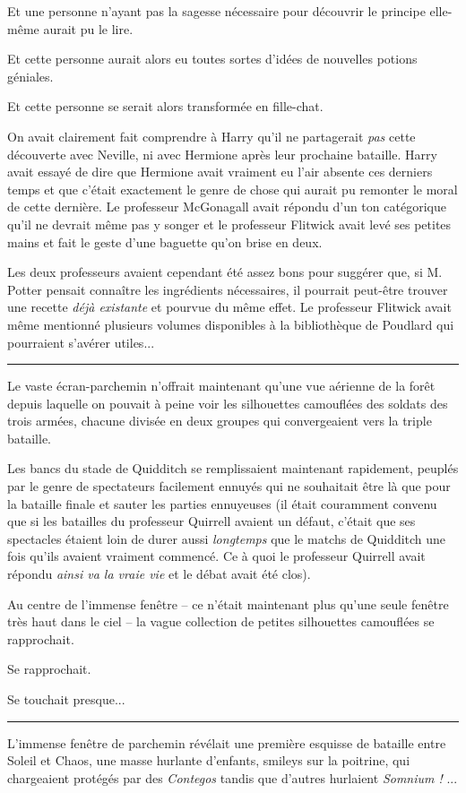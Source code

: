 Et une personne n'ayant pas la sagesse nécessaire pour découvrir le principe elle-même aurait pu le lire.

Et cette personne aurait alors eu toutes sortes d'idées de nouvelles potions géniales.

Et cette personne se serait alors transformée en fille-chat.

On avait clairement fait comprendre à Harry qu'il ne partagerait \emph{pas } cette découverte avec Neville, ni avec Hermione après leur prochaine bataille. Harry avait essayé de dire que Hermione avait vraiment eu l'air absente ces derniers temps et que c'était exactement le genre de chose qui aurait pu remonter le moral de cette dernière. Le professeur McGonagall avait répondu d'un ton catégorique qu'il ne devrait même pas y songer et le professeur Flitwick avait levé ses petites mains et fait le geste d'une baguette qu'on brise en deux.

Les deux professeurs avaient cependant été assez bons pour suggérer que, si M. Potter pensait connaître les ingrédients nécessaires, il pourrait peut-être trouver une recette \emph{déjà existante}  et pourvue du même effet. Le professeur Flitwick avait même mentionné plusieurs volumes disponibles à la bibliothèque de Poudlard qui pourraient s'avérer utiles...
\par\noindent\rule{\textwidth}{0.4pt}
Le vaste écran-parchemin n'offrait maintenant qu'une vue aérienne de la forêt depuis laquelle on pouvait à peine voir les silhouettes camouflées des soldats des trois armées, chacune divisée en deux groupes qui convergeaient vers la triple bataille.

Les bancs du stade de Quidditch se remplissaient maintenant rapidement, peuplés par le genre de spectateurs facilement ennuyés qui ne souhaitait être là que pour la bataille finale et sauter les parties ennuyeuses (il était couramment convenu que si les batailles du professeur Quirrell avaient un défaut, c'était que ses spectacles étaient loin de durer aussi \emph{longtemps } que le matchs de Quidditch une fois qu'ils avaient vraiment commencé. Ce à quoi le professeur Quirrell avait répondu \emph{ainsi va la vraie vie } et le débat avait été clos).

Au centre de l'immense fenêtre – ce n'était maintenant plus qu'une seule fenêtre très haut dans le ciel – la vague collection de petites silhouettes camouflées se rapprochait.

Se rapprochait.

Se touchait presque...
\par\noindent\rule{\textwidth}{0.4pt}
L'immense fenêtre de parchemin révélait une première esquisse de bataille entre Soleil et Chaos, une masse hurlante d'enfants, smileys sur la poitrine, qui chargeaient protégés par des \emph{Contegos } tandis que d'autres hurlaient \emph{Somnium !} ...

